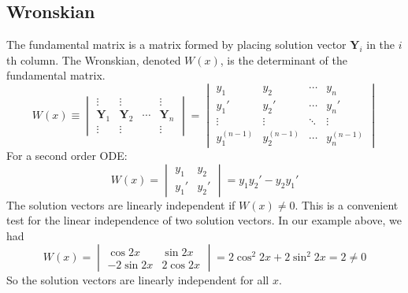 \documentclass{article}
\begin{document}
	\subsection{Wronskian}
	The fundamental matrix is a matrix formed by placing solution vector $\bm Y_i$ in the $i$th column. The Wronskian, denoted $W(x)$, is the determinant of the fundamental matrix.
	\[
		W(x) \equiv \begin{vmatrix}
			\vdots & \vdots & & \vdots \\
			\bm Y_1 & \bm Y_2 & \cdots & \bm Y_n \\
			\vdots & \vdots & & \vdots
		\end{vmatrix} = \begin{vmatrix}
			y_1 & y_2 & \cdots & y_n \\
			y_1' & y_2' & \cdots & y_n' \\
			\vdots & \vdots & \ddots & \vdots \\
			y_1^{(n-1)} & y_2^{(n-1)} & \cdots & y_n^{(n-1)}
		\end{vmatrix}
	\]
	For a second order ODE:
	\begin{equation}\label{wronskian2}
		W(x) = \begin{vmatrix}
			y_1 & y_2 \\ y_1' & y_2'
		\end{vmatrix}
		= y_1y_2' - y_2y_1'
	\end{equation}
	The solution vectors are linearly independent if $W(x) \neq 0$. This is a convenient test for the linear independence of two solution vectors. In our example above, we had
	\[
		W(x) = \begin{vmatrix}
			\cos 2x & \sin 2x \\
			-2\sin 2x & 2\cos 2x
		\end{vmatrix}
		= 2\cos^2 2x + 2\sin^2 2x = 2 \neq 0
	\]
	So the solution vectors are linearly independent for all $x$.
\end{document}
